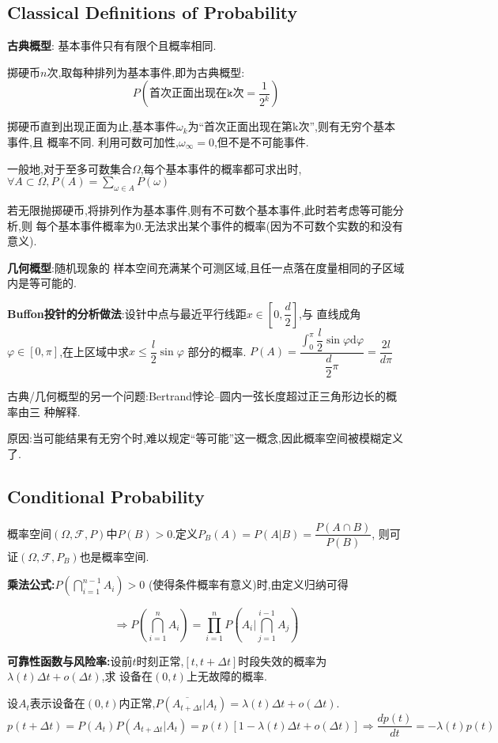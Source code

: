 \subsection{Classical Definitions of Probability}

{\bf 古典概型}: 基本事件只有有限个且概率相同.

掷硬币$ n$次,取每种排列为基本事件,即为古典概型:
\[  P(\texttt{首次正面出现在k次}=\dfrac{1}{2^k})\]

掷硬币直到出现正面为止,基本事件$ \omega_k$为``首次正面出现在第k次'',则有无穷个基本事件,且
概率不同.
利用可数可加性,$ \omega_{\infty} = 0$,但不是不可能事件.

一般地,对于至多可数集合$ \Omega$,每个基本事件的概率都可求出时,$ \forall A
\subset \Omega, P(A) = \sum_{\omega \in A}P(\omega)$

若无限抛掷硬币,将排列作为基本事件,则有不可数个基本事件,此时若考虑等可能分析,则
每个基本事件概率为0.无法求出某个事件的概率(因为不可数个实数的和没有意义).

{\bf 几何概型}:随机现象的 样本空间充满某个可测区域,且任一点落在度量相同的子区域
内是等可能的.

{\bf Buffon投针的分析做法}:设针中点与最近平行线距$ x\in [0, \dfrac{d}{2}]$,与
直线成角$ \varphi\in[0,\pi]$,在上区域中求$ x \le \dfrac{l}{2}\sin{\varphi}$
部分的概率. $ P(A) =
\dfrac{\int_{0}^{\pi}{\dfrac{l}{2}\sin{\varphi}\mathrm{d}{\varphi}}}{\dfrac{d}{2}\pi}
= \dfrac{2l}{d\pi}$

古典/几何概型的另一个问题:Bertrand悖论--圆内一弦长度超过正三角形边长的概率由三
种解释.

原因:当可能结果有无穷个时,难以规定``等可能''这一概念,因此概率空间被模糊定义了.

\subsection{Conditional Probability}
概率空间$( \Omega, \mathcal{F}, P)$中$ P(B) > 0$.定义$ P_B(A) = P(A | B) = \dfrac{P(A\cap B)}{P(B)}$,
则可证$ (\Omega, \mathcal{F}, P_B)$也是概率空间.

  {\bf 乘法公式:}$ P(\bigcap_{i=1}^{n-1}A_i)>0$ (使得条件概率有意义)时,由定义归纳可得

\[ \Rightarrow P(\bigcap_{i=1}^nA_i) = \prod_{i=1}^n{P(A_i | \bigcap_{j=1}^{i-1}A_j)}\]

{\bf 可靠性函数与风险率:}设前$ t$时刻正常,$[t, t+\Delta t]$时段失效的概率为$ \lambda(t)\Delta t + o(\Delta t)$,求
设备在$ (0,t)$上无故障的概率.

设$ A_t$表示设备在$ (0,t)$内正常,$ P(\overline{A_{t+\Delta t}} | A_t) = \lambda(t)\Delta t + o(\Delta t)$.
\[ p(t + \Delta t) = P(A_t)P(A_{t+\Delta t}|A_t) = p(t)[1 - \lambda(t)\Delta t + o(\Delta t)]\Rightarrow \dfrac{dp(t)}{dt}=-\lambda(t)p(t)\]

